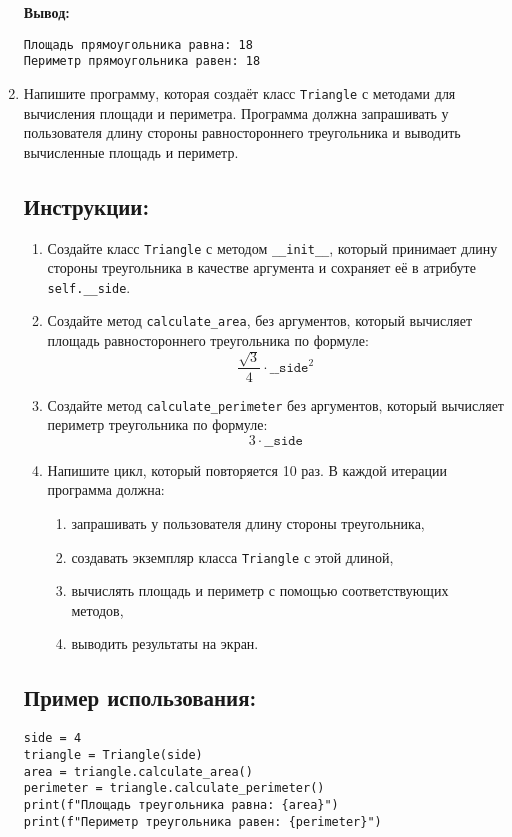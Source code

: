 \begin{enumerate}
\textbf{Вывод:}
\begin{verbatim}
Площадь прямоугольника равна: 18
Периметр прямоугольника равен: 18
\end{verbatim}

\item
Напишите программу, которая создаёт класс \texttt{Triangle} с методами для вычисления площади
и периметра. Программа должна запрашивать у пользователя длину стороны
равностороннего треугольника и выводить вычисленные площадь и периметр.

\subsection*{Инструкции:}
\begin{enumerate}
\item Создайте класс \texttt{Triangle} с методом
\texttt{\_\_init\_\_}, который принимает длину стороны треугольника в
качестве аргумента и сохраняет её в атрибуте \texttt{self.\_\_side}.

\item Создайте метод \texttt{calculate\_area},
без аргументов, который вычисляет площадь равностороннего треугольника по формуле:
\[
\frac{\sqrt{3}}{4} \cdot \texttt{\_\_side}^2
\]

\item Создайте метод \texttt{calculate\_perimeter} без аргументов,
который вычисляет периметр треугольника по формуле:
\[
3 \cdot \texttt{\_\_side}
\]

\item Напишите цикл, который повторяется 10 раз. В каждой итерации программа должна:
\begin{enumerate}
\item запрашивать у пользователя длину стороны треугольника,
\item создавать экземпляр класса \texttt{Triangle} с этой длиной,
\item вычислять площадь и периметр с помощью соответствующих методов,
\item выводить результаты на экран.
\end{enumerate}
\end{enumerate}

\subsection*{Пример использования:}
\begin{verbatim}
side = 4
triangle = Triangle(side)
area = triangle.calculate_area()
perimeter = triangle.calculate_perimeter()
print(f"Площадь треугольника равна: {area}")
print(f"Периметр треугольника равен: {perimeter}")
\end{verbatim}


\end{enumerate}

